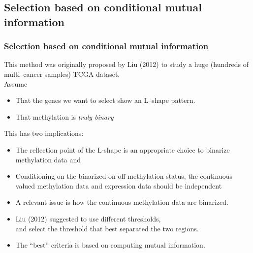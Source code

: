 \documentclass[handout]{beamer}
\begin{document}
\subsection{Selection based on conditional mutual information}

\begin{frame}[allowframebreaks]
\frametitle{Selection based on conditional mutual information}
This method was originally proposed by Liu (2012) to study a huge (hundreds of multi--cancer samples) TCGA dataset.\\
Assume 
 \begin{itemize}
  \item That the genes we want to select show an L--shape pattern. 
\item That methylation is \emph{truly binary}
\end{itemize}
This has two implications:
\begin{itemize}
\item The reflection point of the L-shape is an appropriate choice to
  binarize methylation data %
and
\item Conditioning on the binarized on-off methylation status, the
  continuous valued methylation data and expression data should be
  independent%
\end{itemize}

\framebreak
\begin{itemize}
\item A relevant issue is how the continuous methylation data are binarized.
\item Liu (2012) suggested to use different thresholds,\\
 and select the threshold that best separated the two regions.
\item The ``best'' criteria is based on computing mutual information.
\end{itemize}

\end{frame}
\end{document}
